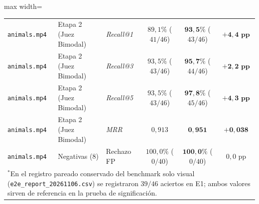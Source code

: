 \begin{table}[htbp]
\begin{adjustbox}{max width=\linewidth}
\begin{tabular}{lllccc}
\texttt{animals.mp4} & Etapa 2 (Juez Bimodal) & \textit{Recall@1} & $89,1\%$ ($41/46$) & $\mathbf{93,5\%}$ ($43/46$) & $\mathbf{+4,4\text{ pp}}$ \\
\texttt{animals.mp4} & Etapa 2 (Juez Bimodal) & \textit{Recall@3} & $93,5\%$ ($43/46$) & $\mathbf{95,7\%}$ ($44/46$) & $\mathbf{+2,2\text{ pp}}$ \\
\texttt{animals.mp4} & Etapa 2 (Juez Bimodal) & \textit{Recall@5} & $93,5\%$ ($43/46$) & $\mathbf{97,8\%}$ ($45/46$) & $\mathbf{+4,3\text{ pp}}$ \\
\texttt{animals.mp4} & Etapa 2 (Juez Bimodal) & \textit{MRR} & $0,913$ & $\mathbf{0,951}$ & $\mathbf{+0,038}$ \\ \addlinespace[2.5pt]
\texttt{animals.mp4} & Negativas ($8$) & Rechazo FP & $100,0\%$ ($0/40$) & $\mathbf{100,0\%}$ ($0/40$) & $0,0\text{ pp}$ \\
\bottomrule
\multicolumn{6}{l}{\scriptsize $^*$En el registro pareado conservado del benchmark solo visual (\texttt{e2e\_report\_20261106.csv}) se registraron $39/46$ aciertos en E1; ambos valores sirven de referencia en la prueba de significación.}
\end{tabular}
\end{adjustbox}
\end{table}

